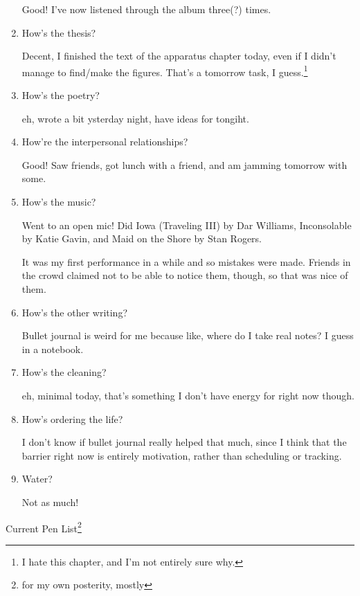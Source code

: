 \documentclass[12pt]{article}
\renewcommand{\,}{\textsuperscript{,}}
\begin{document}
\begin{enumerate}
Good! I've now listened through the album three(?) times.

\item How's the thesis?

Decent, I finished the text of the apparatus chapter today, even if I didn't manage to find/make the figures. That's a tomorrow task, I guess.\footnote{I hate this chapter, and I'm not entirely sure why.}

\item How's the poetry?

eh, wrote a bit ysterday night, have ideas for tongiht.

\item How're the interpersonal relationships?

Good! Saw friends, got lunch with a friend, and am jamming tomorrow with some.

\item How's the music?

Went to an open mic! Did Iowa (Traveling III) by Dar Williams, Inconsolable by Katie Gavin, and Maid on the Shore by Stan Rogers.

It was my first performance in a while and so mistakes were made.  
Friends in the crowd claimed not to be able to notice them, though, so that was nice of them.

\item How's the other writing?

Bullet journal is weird for me because like, where do I take real notes? I guess in a notebook.

\item How's the cleaning?

eh, minimal today, that's something I don't have energy for right now though.

\item How's ordering the life?

I don't know if bullet journal really helped that much, since I think that the barrier right now is entirely motivation, rather than scheduling or tracking.

\item Water?

Not as much!

\end{enumerate}

Current Pen List\footnote{for my own posterity, mostly}
\end{document}
